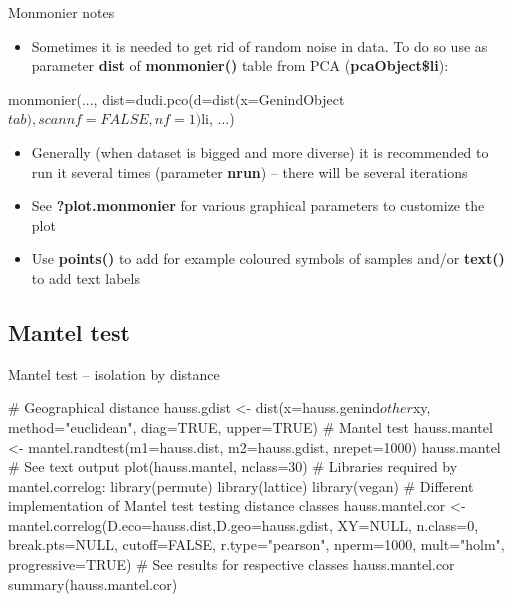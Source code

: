 \documentclass[compress, ucs, xelatex, 11pt, xcolor=svgnames,
  hyperref={
    bookmarks=true,
    unicode=true,
    colorlinks=true,
    pdftitle={Molecular data in R},
    plainpages=false,
    pdfauthor={Vojtech Zeisek},
    pdfsubject={Course about phylogeny and evolution in R},
    pdfcreator={XeLaTeX},
    pdfkeywords={R, evolution, phylogeny, molecular data},
    linkcolor=Tomato,
    anchorcolor=SaddleBrown,
    citecolor=Goldenrod,
    filecolor=DarkMagenta,
    menucolor=Sienna,
    urlcolor=DarkTurquoise,
    pdftex},
  url={hyphens, lowtilde} %
  ]{beamer}
\begin{document}
\begin{frame}[fragile]{Monmonier notes}
\begin{itemize}
 \item Sometimes it is needed to get rid of random noise in data. To do so use as parameter \textbf{dist} of \textbf{monmonier()} table from PCA (\textbf{pcaObject\$li}):
\end{itemize}
  \begin{spluscode}
    monmonier(..., dist=dudi.pco(d=dist(x=GenindObject$tab),
      scannf=FALSE, nf=1)$li, ...)
  \end{spluscode}
\begin{itemize}
 \item Generally (when dataset is bigged and more diverse) it is recommended to run it several times (parameter \textbf{nrun}) -- there will be several iterations
 \item See \textbf{?plot.monmonier} for various graphical parameters to customize the plot
 \item Use \textbf{points()} to add for example coloured symbols of samples and/or \textbf{text()} to add text labels
\end{itemize}
\end{frame}

\subsection{Mantel test}

\begin{frame}[fragile]{Mantel test -- isolation by distance}
  \begin{spluscode}
    # Geographical distance
    hauss.gdist <- dist(x=hauss.genind$other$xy, method="euclidean",
      diag=TRUE, upper=TRUE)
    # Mantel test
    hauss.mantel <- mantel.randtest(m1=hauss.dist, m2=hauss.gdist,
      nrepet=1000)
    hauss.mantel # See text output
    plot(hauss.mantel, nclass=30)
    # Libraries required by mantel.correlog:
    library(permute)
    library(lattice)
    library(vegan)
    # Different implementation of Mantel test testing distance classes
    hauss.mantel.cor <- mantel.correlog(D.eco=hauss.dist,D.geo=hauss.gdist,
      XY=NULL, n.class=0, break.pts=NULL, cutoff=FALSE, r.type="pearson",
      nperm=1000, mult="holm", progressive=TRUE)
    # See results for respective classes
    hauss.mantel.cor
    summary(hauss.mantel.cor)
  \end{spluscode}
\end{frame}
\end{document}

